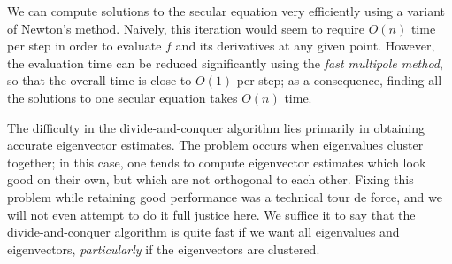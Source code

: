 We can compute solutions to the secular equation very efficiently using
a variant of Newton's method.  Naively, this iteration would seem to
require $O(n)$ time per step in order to evaluate $f$ and its derivatives
at any given point.  However, the evaluation time can be reduced
significantly using the {\em fast multipole method}, so that the overall
time is close to $O(1)$ per step; as a consequence, finding all the
solutions to one secular equation takes $O(n)$ time.

The difficulty in the divide-and-conquer algorithm lies primarily in
obtaining accurate eigenvector estimates.  The problem occurs when
eigenvalues cluster together; in this case, one tends to compute
eigenvector estimates which look good on their own, but which are not
orthogonal to each other.  Fixing this problem while retaining good
performance was a technical tour de force, and we will not even attempt
to do it full justice here.  We suffice it to say that the divide-and-conquer
algorithm is quite fast if we want all eigenvalues and eigenvectors,
{\em particularly} if the eigenvectors are clustered.
